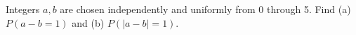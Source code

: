 Integers $ a,b $ are chosen independently and uniformly from 0 through 5. Find (a) $ P(a-b=1)$ and (b) $ P(|a-b|=1)$.
